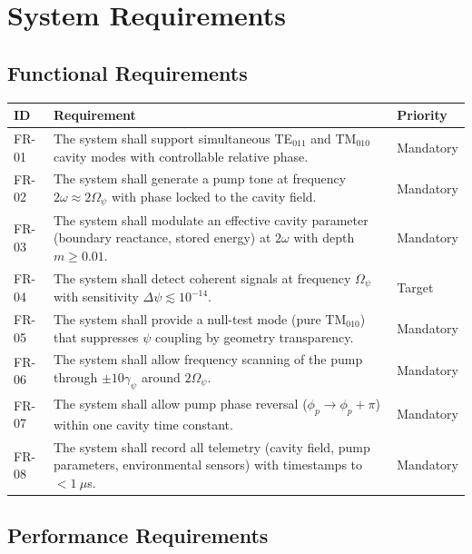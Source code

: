 \documentclass[12pt,letterpaper]{article}
\begin{document}
\section{System Requirements}

\subsection{Functional Requirements}

\begin{longtable}{p{1.2cm}p{11cm}p{2cm}}
\toprule
\textbf{ID} & \textbf{Requirement} & \textbf{Priority} \\
\midrule
\endfirsthead
FR-01 & The system shall support simultaneous TE$_{011}$ and TM$_{010}$
  cavity modes with controllable relative phase. & Mandatory \\
FR-02 & The system shall generate a pump tone at frequency
  $2\omega \approx 2\Omega_\psi$ with phase locked to the cavity field. & Mandatory \\
FR-03 & The system shall modulate an effective cavity parameter
  (boundary reactance, stored energy) at $2\omega$ with depth
  $m \geq 0.01$. & Mandatory \\
FR-04 & The system shall detect coherent signals at frequency $\Omega_\psi$
  with sensitivity $\Delta\psi \lesssim 10^{-14}$. & Target \\
FR-05 & The system shall provide a null-test mode (pure TM$_{010}$)
  that suppresses $\psi$ coupling by geometry transparency. & Mandatory \\
FR-06 & The system shall allow frequency scanning of the pump through
  $\pm 10\gamma_\psi$ around $2\Omega_\psi$. & Mandatory \\
FR-07 & The system shall allow pump phase reversal ($\phi_p \to \phi_p + \pi$)
  within one cavity time constant. & Mandatory \\
FR-08 & The system shall record all telemetry (cavity field, pump
  parameters, environmental sensors) with timestamps to $< 1~\mu$s. & Mandatory \\
\bottomrule
\end{longtable}

\subsection{Performance Requirements}
\end{document}
